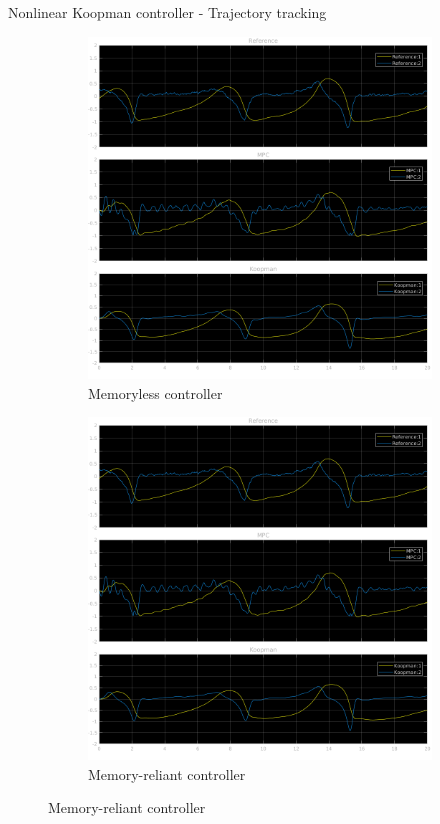 \documentclass{beamer}
\begin{document}
\begin{frame}{Nonlinear Koopman controller - Trajectory tracking}
    \begin{figure}
        \centering
        \begin{subfigure}[b]{0.45\textwidth}
            \centering
            \includegraphics[width=\textwidth]{Undelayed_Koopman_Ref.png}
            \caption{Memoryless controller}
        \end{subfigure}
        \hfill
        \begin{subfigure}[b]{0.45\textwidth}
            \centering
            \includegraphics[width=\textwidth]{Delayed_Koopman_Ref.png}
            \caption{Memory-reliant controller}
        \end{subfigure}
    \end{figure}
\end{frame}
\end{document}
